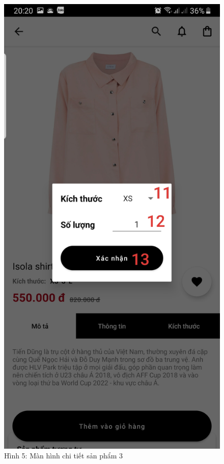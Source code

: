 \documentclass{beamer}
\begin{document}
\begin{frame}
    \begin{columns}
        \begin{figure}
            \centering
            \includegraphics[height=0.7\textheight]{images/04.png}
            \caption{\centering\tiny{Hình 5: Màn hình chi tiết sản phẩm 3}}


\end{figure}
\end{columns}
\end{frame}
\end{document}
